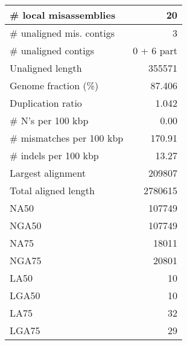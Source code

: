 \documentclass[12pt,a4paper]{article}
\begin{document}
\begin{table}[ht]
\begin{center}
\begin{tabular}{|l*{1}{|r}|}
\# local misassemblies & 20 \\ \hline
\# unaligned mis. contigs & 3 \\ \hline
\# unaligned contigs & 0 + 6 part \\ \hline
Unaligned length & 355571 \\ \hline
Genome fraction (\%) & 87.406 \\ \hline
Duplication ratio & 1.042 \\ \hline
\# N's per 100 kbp & 0.00 \\ \hline
\# mismatches per 100 kbp & 170.91 \\ \hline
\# indels per 100 kbp & 13.27 \\ \hline
Largest alignment & 209807 \\ \hline
Total aligned length & 2780615 \\ \hline
NA50 & 107749 \\ \hline
NGA50 & 107749 \\ \hline
NA75 & 18011 \\ \hline
NGA75 & 20801 \\ \hline
LA50 & 10 \\ \hline
LGA50 & 10 \\ \hline
LA75 & 32 \\ \hline
LGA75 & 29 \\ \hline
\end{tabular}
\end{center}
\end{table}
\end{document}
